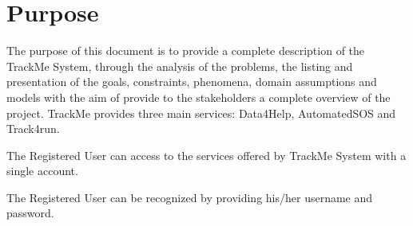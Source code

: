 \section{Purpose}
The purpose of this document is to provide a complete description of the TrackMe System, through the analysis of the problems, the listing and presentation of the goals, constraints, phenomena, domain assumptions and models with the aim of provide to the stakeholders a complete overview of the project. TrackMe provides three main services: Data4Help, AutomatedSOS and Track4run.

\begin{enumerate}[label={[}G\arabic*{]}]
\item \label{goal:trackme1} The Registered User can access to the services offered by TrackMe System with a single account.
    
    \item \label{goal:trackme2}The Registered User can be recognized by providing his/her username and password.
    
    
\end{enumerate}

